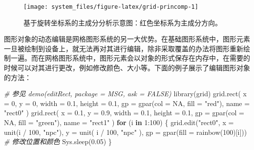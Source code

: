 \documentclass[
  b5paper,
  UTF8,twoside]{book}
\newenvironment{Shaded}{\begin{snugshade}}{\end{snugshade}}
\newcommand{\AttributeTok}[1]{\textcolor[rgb]{0.77,0.63,0.00}{#1}}
\newcommand{\CommentTok}[1]{\textcolor[rgb]{0.56,0.35,0.01}{\textit{#1}}}
\newcommand{\ConstantTok}[1]{\textcolor[rgb]{0.00,0.00,0.00}{#1}}
\newcommand{\ControlFlowTok}[1]{\textcolor[rgb]{0.13,0.29,0.53}{\textbf{#1}}}
\newcommand{\DecValTok}[1]{\textcolor[rgb]{0.00,0.00,0.81}{#1}}
\newcommand{\FloatTok}[1]{\textcolor[rgb]{0.00,0.00,0.81}{#1}}
\newcommand{\FunctionTok}[1]{\textcolor[rgb]{0.00,0.00,0.00}{#1}}
\newcommand{\NormalTok}[1]{#1}
\newcommand{\SpecialCharTok}[1]{\textcolor[rgb]{0.00,0.00,0.00}{#1}}
\newcommand{\StringTok}[1]{\textcolor[rgb]{0.31,0.60,0.02}{#1}}
\begin{document}
\begin{figure}

{\centering \texttt{[image: system\_files/figure-latex/grid-princomp-1]} 

}

\caption[基于旋转坐标系的主成分分析示意图]{基于旋转坐标系的主成分分析示意图：红色坐标系为主成分方向。}\label{fig:grid-princomp}
\end{figure}



图形对象的动态编辑是网格图形系统的另一大优势。在基础图形系统中，图形元素一旦被绘制到设备上，就无法再对其进行编辑，除非采取覆盖的办法将图形重新绘制一遍。而在网格图形系统中，图形元素会以对象的形式保存在内存中，在需要的时候可以对其进行更改，例如修改颜色、大小等。下面的例子展示了编辑图形对象的方法：

\begin{Shaded}
\begin{Highlighting}[]
\CommentTok{\# 参见 demo(\textquotesingle{}editRect\textquotesingle{}, package = \textquotesingle{}MSG\textquotesingle{}, ask = FALSE)}
\FunctionTok{library}\NormalTok{(grid)}
\FunctionTok{grid.rect}\NormalTok{(}
  \AttributeTok{x =} \DecValTok{0}\NormalTok{, }\AttributeTok{y =} \DecValTok{0}\NormalTok{, }\AttributeTok{width =} \FloatTok{0.1}\NormalTok{, }\AttributeTok{height =} \FloatTok{0.1}\NormalTok{,}
  \AttributeTok{gp =} \FunctionTok{gpar}\NormalTok{(}\AttributeTok{col =} \ConstantTok{NA}\NormalTok{, }\AttributeTok{fill =} \StringTok{"red"}\NormalTok{), }\AttributeTok{name =} \StringTok{"rect0"}
\NormalTok{)}
\FunctionTok{grid.rect}\NormalTok{(}
  \AttributeTok{x =} \FloatTok{0.1}\NormalTok{, }\AttributeTok{y =} \FloatTok{0.9}\NormalTok{, }\AttributeTok{width =} \FloatTok{0.1}\NormalTok{, }\AttributeTok{height =} \FloatTok{0.1}\NormalTok{,}
  \AttributeTok{gp =} \FunctionTok{gpar}\NormalTok{(}\AttributeTok{col =} \ConstantTok{NA}\NormalTok{, }\AttributeTok{fill =} \StringTok{"green"}\NormalTok{), }\AttributeTok{name =} \StringTok{"rect1"}
\NormalTok{)}
\ControlFlowTok{for}\NormalTok{ (i }\ControlFlowTok{in} \DecValTok{1}\SpecialCharTok{:}\DecValTok{100}\NormalTok{) \{}
  \FunctionTok{grid.edit}\NormalTok{(}\StringTok{"rect0"}\NormalTok{, }\AttributeTok{x =} \FunctionTok{unit}\NormalTok{(i }\SpecialCharTok{/} \DecValTok{100}\NormalTok{, }\StringTok{"npc"}\NormalTok{), }\AttributeTok{y =} \FunctionTok{unit}\NormalTok{(}
\NormalTok{    i }\SpecialCharTok{/} \DecValTok{100}\NormalTok{,}
    \StringTok{"npc"}
\NormalTok{  ), }\AttributeTok{gp =} \FunctionTok{gpar}\NormalTok{(}\AttributeTok{fill =} \FunctionTok{rainbow}\NormalTok{(}\DecValTok{100}\NormalTok{)[i])) }\CommentTok{\# 修改位置和颜色}
  \FunctionTok{Sys.sleep}\NormalTok{(}\FloatTok{0.05}\NormalTok{)}
\NormalTok{\}}
\end{Highlighting}
\end{Shaded}
\end{document}
